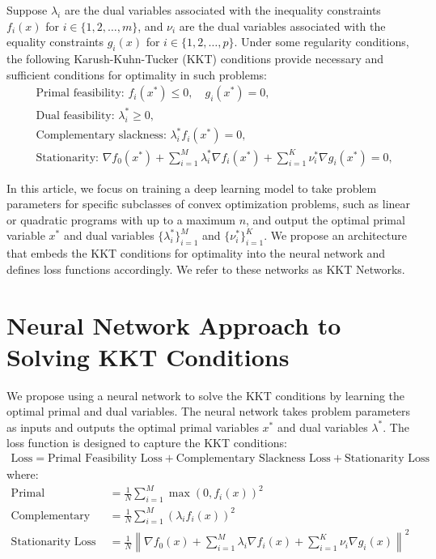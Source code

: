 \documentclass{article} %
\begin{document}
Suppose \( \lambda_i \) are the dual variables associated with the inequality constraints \( f_i(x) \) for \( i \in \{1,2,\ldots,m\} \), and \( \nu_i \) are the dual variables associated with the equality constraints \( g_i(x) \) for \( i \in \{1,2,\ldots,p\} \). Under some regularity conditions, the following Karush-Kuhn-Tucker (KKT) conditions provide necessary and sufficient conditions for optimality in such problems:
\begin{align}
&\text{Primal feasibility: } f_i(x^*) \leq 0, \quad g_i(x^*) = 0, \\
&\text{Dual feasibility: } \lambda_i^* \geq 0, \\
&\text{Complementary slackness: } \lambda_i^* f_i(x^*) = 0, \\
&\text{Stationarity: } \nabla f_0(x^*) + \sum_{i=1}^{M} \lambda_i^* \nabla f_i(x^*) + \sum_{i=1}^{K} \nu_i^* \nabla g_i(x^*) = 0,
\end{align}
 
In this article, we focus on training a deep learning model to take problem parameters for specific subclasses of convex optimization problems, such as linear or quadratic programs with up to a maximum \( n \), and output the optimal primal variable \( x^* \) and dual variables \( \{ \lambda_i^* \}_{i=1}^M \) and \( \{ \nu_i^* \}_{i=1}^K \).  We propose an architecture that embeds the KKT conditions for optimality into the neural network and defines loss functions accordingly. We refer to these networks as KKT Networks.

\section{Neural Network Approach to Solving KKT Conditions}

We propose using a neural network to solve the KKT conditions by learning the optimal primal and dual variables. The neural network takes problem parameters as inputs and outputs the optimal primal variables \( x^* \) and dual variables \( \lambda^* \). The loss function is designed to capture the KKT conditions:
\begin{align}
\text{Loss} = \text{Primal Feasibility Loss} + \text{Complementary Slackness Loss} + \text{Stationarity Loss}
\end{align}
where:
\begin{align}
\text{Primal Feasibility Loss} &= \frac{1}{N} \sum_{i=1}^{M} \max(0, f_i(x))^2 \\
\text{Complementary Slackness Loss} &= \frac{1}{N} \sum_{i=1}^{M} (\lambda_i f_i(x))^2 \\
\text{Stationarity Loss} &= \frac{1}{N} \left\| \nabla f_0(x) + \sum_{i=1}^{M} \lambda_i \nabla f_i(x) + \sum_{i=1}^{K} \nu_i \nabla g_i(x) \right\|^2
\end{align}
\end{document}
